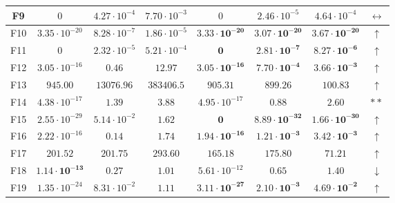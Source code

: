 \begin{table}[!t]
\begin{scriptsize}
\begin{tabular}{c || c c c | c c c c}
F9  & $0$                    & $4.27 \cdot 10^{-4}$  & $7.70 \cdot 10^{-3}$  & $0$                            & $2.46 \cdot 10^{-5}$           & $4.64 \cdot 10^{-4}$           & $\leftrightarrow$   \\ \hline
F10 & $3.35 \cdot 10^{-20}$  & $8.28 \cdot 10^{-7}$  & $1.86 \cdot 10^{-5}$  & $\mathbf{3.33 \cdot 10^{-20}}$ & $\mathbf{3.07 \cdot 10^{-20}}$ & $\mathbf{3.67 \cdot 10^{-20}}$ & $\uparrow$          \\ \hline
F11 & $0$                    & $2.32 \cdot 10^{-5}$  & $5.21 \cdot 10^{-4}$  & $\mathbf{0}$                   & $\mathbf{2.81 \cdot 10^{-7}}$  & $\mathbf{8.27 \cdot 10^{-6}}$  & $\uparrow$   \\ \hline
F12 & $3.05 \cdot 10^{-16}$  & $0.46$                & $12.97$               & $\mathbf{3.05 \cdot 10^{-16}}$ & $\mathbf{7.70 \cdot 10^{-4}}$  & $\mathbf{3.66 \cdot 10^{-3}}$  & $\uparrow$          \\ \hline
F13 & $945.00$               & $13076.96$            & $383406.5$            & $\mathbf{905.31}$              & $\mathbf{899.26}$              & $\mathbf{100.83}$              & $\uparrow$          \\ \hline
F14 & $4.38 \cdot 10^{-17}$  & $1.39$                & $3.88$                & $4.95 \cdot 10^{-17}$          & $0.88$                         & $2.60$                         & $**$          \\ \hline
F15 & $2.55 \cdot 10^{-29}$  & $5.14 \cdot 10^{-2}$  & $1.62$                & $\mathbf{0}$                   & $\mathbf{8.89 \cdot 10^{-32}}$ & $\mathbf{1.66 \cdot 10^{-30}}$ & $\uparrow$          \\ \hline
F16 & $2.22 \cdot 10^{-16}$  & $0.14$                & $1.74$                & $\mathbf{1.94 \cdot 10^{-16}}$ & $\mathbf{1.21 \cdot 10^{-3}}$  & $\mathbf{3.42 \cdot 10^{-3}}$  & $\uparrow$          \\ \hline
F17 & $201.52$                & $201.75$             & $293.60$              & $\mathbf{165.18}$              & $\mathbf{175.80}$              & $\mathbf{71.21}$               & $\uparrow$          \\ \hline
F18 & $\mathbf{1.14 \cdot 10^{-13}}$  & $\mathbf{0.27}$ & $\mathbf{1.01}$    & $5.61 \cdot 10^{-12}$          & $0.65$                         & $1.40$                         & $\downarrow$   \\ \hline
F19 & $1.35 \cdot 10^{-24}$  & $8.31 \cdot 10^{-2}$  & $1.11$                & $\mathbf{3.11 \cdot 10^{-27}}$ & $\mathbf{2.10 \cdot 10^{-3}}$  & $\mathbf{4.69 \cdot 10^{-2}}$ & $\uparrow$          \\ \hline
\end{tabular}
\end{scriptsize}
\end{table}

